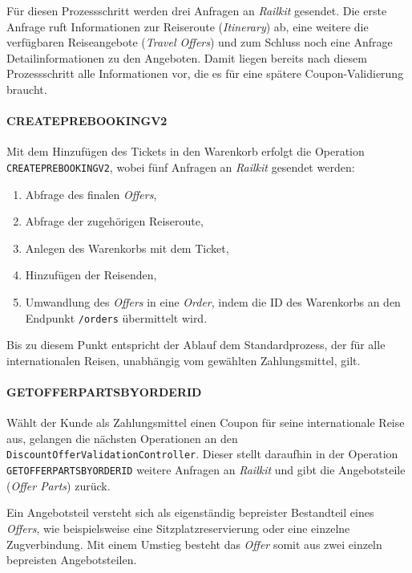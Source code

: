 
Für diesen Prozessschritt werden drei Anfragen an \textit{Railkit} gesendet. Die erste Anfrage ruft Informationen zur Reiseroute (\textit{Itinerary}) ab, eine weitere die verfügbaren Reiseangebote (\textit{Travel Offers}) und zum Schluss noch eine Anfrage Detailinformationen zu den Angeboten. Damit liegen bereits nach diesem Prozessschritt alle Informationen vor, die es für eine spätere Coupon-Validierung braucht.

\paragraph{CREATEPREBOOKINGV2}
Mit dem Hinzufügen des Tickets in den Warenkorb erfolgt die Operation \texttt{CREATEPREBOOKINGV2}, wobei fünf Anfragen an \textit{Railkit} gesendet werden:
\begin{enumerate}
    \item Abfrage des finalen \textit{Offers},
    \item Abfrage der zugehörigen Reiseroute,
    \item Anlegen des Warenkorbs mit dem Ticket,
    \item Hinzufügen der Reisenden,
    \item Umwandlung des \textit{Offers} in eine \textit{Order}, indem die ID des Warenkorbs an den Endpunkt \texttt{/orders} übermittelt wird.
\end{enumerate}

Bis zu diesem Punkt entspricht der Ablauf dem Standardprozess, der für alle internationalen Reisen, unabhängig vom gewählten Zahlungsmittel, gilt.

\paragraph{GETOFFERPARTSBYORDERID}
Wählt der Kunde als Zahlungsmittel einen Coupon für seine internationale Reise aus, gelangen die nächsten Operationen an den \texttt{DiscountOfferValidationController}. Dieser stellt daraufhin in der Operation \texttt{GETOFFERPARTSBYORDERID} weitere Anfragen an \textit{Railkit} und gibt die Angebotsteile (\textit{Offer Parts}) zurück.

Ein Angebotsteil versteht sich als eigenständig bepreister Bestandteil eines \textit{Offers}, wie beispielsweise eine Sitzplatzreservierung oder eine einzelne Zugverbindung. Mit einem Umstieg besteht das \textit{Offer} somit aus zwei einzeln bepreisten Angebotsteilen.

